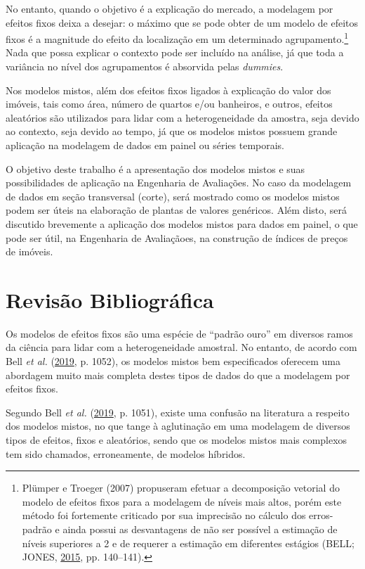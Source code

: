 \documentclass[
  a4paper, 11pt]{article}
\begin{document}
No entanto, quando o objetivo é a explicação do mercado, a modelagem por
efeitos fixos deixa a desejar: o máximo que se pode obter de um modelo
de efeitos fixos é a magnitude do efeito da localização em um
determinado agrupamento.\footnote{Plümper e Troeger (2007) propuseram
  efetuar a decomposição vetorial do modelo de efeitos fixos para a
  modelagem de níveis mais altos, porém este método foi fortemente
  criticado por sua imprecisão no cálculo dos erros-padrão e ainda
  possui as desvantagens de não ser possível a estimação de níveis
  superiores a 2 e de requerer a estimação em diferentes estágios (BELL;
  JONES, \protect\hyperlink{ref-bell2015}{2015}, pp. 140--141).} Nada
que possa explicar o contexto pode ser incluído na análise, já que toda
a variância no nível dos agrupamentos é absorvida pelas \emph{dummies}.

Nos modelos mistos, além dos efeitos fixos ligados à explicação do valor
dos imóveis, tais como área, número de quartos e/ou banheiros, e outros,
efeitos aleatórios são utilizados para lidar com a heterogeneidade da
amostra, seja devido ao contexto, seja devido ao tempo, já que os
modelos mistos possuem grande aplicação na modelagem de dados em painel
ou séries temporais.

O objetivo deste trabalho é a apresentação dos modelos mistos e suas
possibilidades de aplicação na Engenharia de Avaliações. No caso da
modelagem de dados em seção transversal (corte), será mostrado como os
modelos mistos podem ser úteis na elaboração de plantas de valores
genéricos. Além disto, será discutido brevemente a aplicação dos modelos
mistos para dados em painel, o que pode ser útil, na Engenharia de
Avaliaçãoes, na construção de índices de preços de imóveis.

\hypertarget{revisuxe3o-bibliogruxe1fica}{%
\section{Revisão Bibliográfica}\label{revisuxe3o-bibliogruxe1fica}}

Os modelos de efeitos fixos são uma espécie de ``padrão ouro'' em
diversos ramos da ciência para lidar com a heterogeneidade amostral. No
entanto, de acordo com Bell \emph{et al.}
(\protect\hyperlink{ref-bell2019}{2019}, p. 1052), os modelos mistos bem
especificados oferecem uma abordagem muito mais completa destes tipos de
dados do que a modelagem por efeitos fixos.

Segundo Bell \emph{et al.} (\protect\hyperlink{ref-bell2019}{2019}, p.
1051), existe uma confusão na literatura a respeito dos modelos mistos,
no que tange à aglutinação em uma modelagem de diversos tipos de
efeitos, fixos e aleatórios, sendo que os modelos mistos mais complexos
tem sido chamados, erroneamente, de modelos híbridos.
\end{document}
